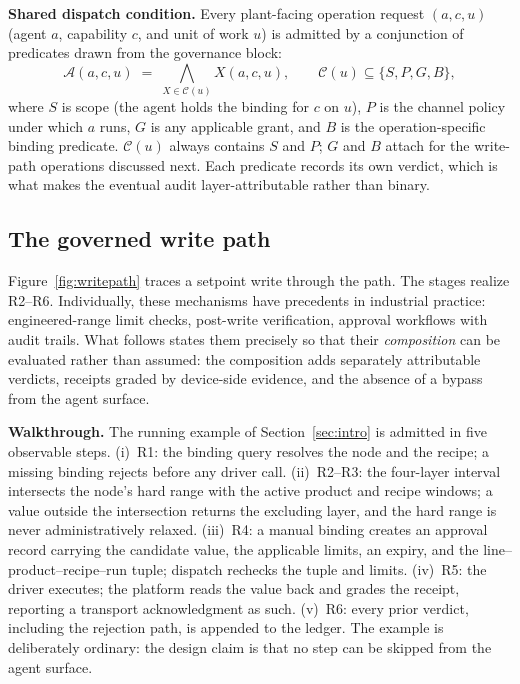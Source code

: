 \textbf{Shared dispatch condition.} Every plant-facing operation request
$(a, c, u)$ (agent $a$, capability $c$, and unit of work $u$) is
admitted by a conjunction of predicates drawn from the governance block:
\begin{equation}
\mathcal{A}(a,c,u) \;=\; \bigwedge_{X \in \mathcal{C}(u)} X(a,c,u),
\qquad \mathcal{C}(u) \subseteq \{S, P, G, B\},
\label{eq:dispatch}
\end{equation}
where $S$ is scope (the agent holds the binding for $c$ on $u$), $P$ is the
channel policy under which $a$ runs, $G$ is any applicable grant, and $B$
is the operation-specific binding predicate. $\mathcal{C}(u)$ always
contains $S$ and $P$; $G$ and $B$ attach for the write-path operations
discussed next. Each predicate records its own verdict, which is what makes
the eventual audit layer-attributable rather than binary.

\subsection{The governed write path}
\label{sec:arch-write}

Figure~\ref{fig:writepath} traces a setpoint write through the path. The
stages realize R2--R6. Individually, these mechanisms have precedents in
industrial practice: engineered-range limit checks, post-write
verification, approval workflows with audit trails. What follows states
them precisely so that their \emph{composition} can be evaluated rather
than assumed: the composition adds separately attributable verdicts,
receipts graded by device-side evidence, and the absence of a bypass from
the agent surface.

\textbf{Walkthrough.} The running example of Section~\ref{sec:intro} is
admitted in five observable steps. (i)~R1: the binding query resolves the
node and the recipe; a missing binding rejects before any driver call.
(ii)~R2--R3: the four-layer interval intersects the node's hard range with
the active product and recipe windows; a value outside the intersection
returns the excluding layer, and the hard range is never administratively
relaxed. (iii)~R4: a manual binding creates an approval record carrying the
candidate value, the applicable limits, an expiry, and the
line--product--recipe--run tuple; dispatch rechecks the tuple and limits.
(iv)~R5: the driver executes; the platform reads the value back and grades
the receipt, reporting a transport acknowledgment as such. (v)~R6: every
prior verdict, including the rejection path, is appended to the ledger.
The example is deliberately ordinary: the design claim is that no step can
be skipped from the agent surface.

